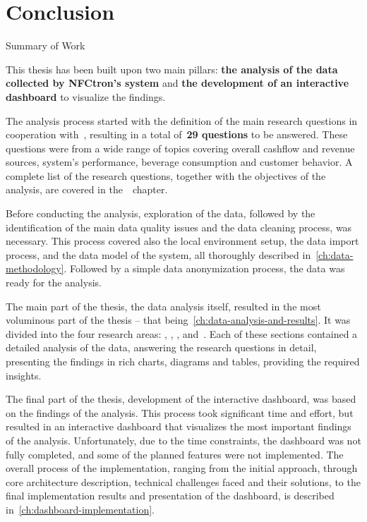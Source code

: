 \chapter{Conclusion}
\label{ch:conclusion}


\begin{section}{Summary of Work}
	\label{sec:conclusion-summary}

	This thesis has been built upon two main pillars: \textbf{the analysis of the data collected by NFCtron's system} and \textbf{the development of an interactive dashboard} to visualize the findings.

	The analysis process started with the definition of the main research questions in cooperation with~\theOrganizer, resulting in a total of~\textbf{29 questions} to be answered.
	These questions were from a wide range of topics covering overall cashflow and revenue sources, system's performance, beverage consumption and customer behavior.
	A complete list of the research questions, together with the objectives of the analysis, are covered in the~~chapter.

	Before conducting the analysis, exploration of the data, followed by the identification of the main data quality issues and the data cleaning process, was necessary.
	This process covered also the local environment setup, the data import process, and the data model of the system, all thoroughly described in~\autoref{ch:data-methodology}.
	Followed by a simple data anonymization process, the data was ready for the analysis.

	The main part of the thesis, the data analysis itself, resulted in the most voluminous part of the thesis – that being~\autoref{ch:data-analysis-and-results}.
	It was divided into the four research areas: , , , and~.
	Each of these sections contained a detailed analysis of the data, answering the research questions in detail, presenting the findings in rich charts, diagrams and tables, providing the required insights.

	The final part of the thesis, development of the interactive dashboard, was based on the findings of the analysis.
	This process took significant time and effort, but resulted in an interactive dashboard that visualizes the most important findings of the analysis.
	Unfortunately, due to the time constraints, the dashboard was not fully completed, and some of the planned features were not implemented.
	The overall process of the implementation, ranging from the initial approach, through core architecture description, technical challenges faced and their solutions, to the final implementation results and presentation of the dashboard, is
	described in~\autoref{ch:dashboard-implementation}.


\end{section}
